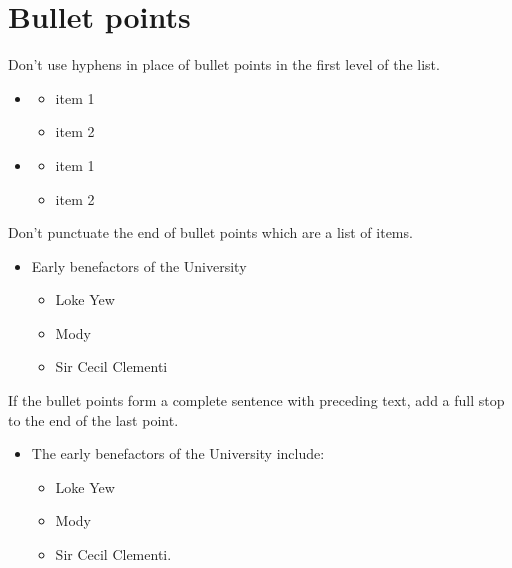 \documentclass[11pt,a4paper]{book}
\newcommand{\xmark}{{\color{cadmiumred}\ding{54}}}%
\newcommand{\cmark}{{\color{green(html/cssgreen)}\checkmark}}%
\begin{document}
			\section{Bullet points}
			Don't use hyphens in place of bullet points in the first level of the list.
			{\firasans \begin{mdframed}[backgroundcolor=aliceblue] \begin{itemize}[label=\cmark]
				\item  \begin{itemize}[label=\bullet]
					\item item 1
					\item item 2
				\end{itemize} 
			\end{itemize} \end{mdframed} }
			{\firasans \begin{mdframed}[backgroundcolor=aliceblue] \begin{itemize}[label=\cmark]
				\item[\xmark]  \begin{itemize}[label=-]
					\item item 1
					\item item 2
				\end{itemize}
			\end{itemize} \end{mdframed} }
		\newpage
		Don't punctuate the end of bullet points which are a list of items.
		{\firasans \begin{mdframed}[backgroundcolor=aliceblue] \begin{itemize}[label=\cmark]
			\item Early benefactors of the University \begin{itemize}[label=\cmark]
				\item[$\bullet$] Loke Yew
				\item[$\bullet$] Mody
				\item[$\bullet$] Sir Cecil Clementi
			\end{itemize} 
		\end{itemize} \end{mdframed} }
		If the bullet points form a complete sentence with preceding text, add a full stop to the end of the last point.
		{\firasans \begin{mdframed}[backgroundcolor=aliceblue] \begin{itemize}[label=\cmark]
			\item The early benefactors of the University include: \begin{itemize}[label=\bullet]
				\item Loke Yew
				\item Mody
				\item Sir Cecil Clementi.
			\end{itemize}
		\end{itemize} \end{mdframed} }
\end{document}
